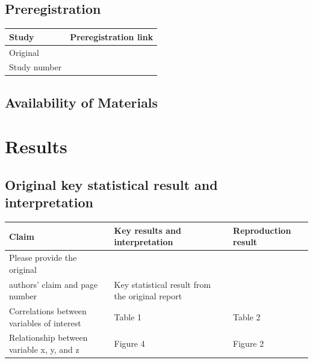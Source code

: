 \documentclass[
  letterpaper,
  DIV=11,
  numbers=noendperiod]{scrartcl}
\begin{document}
\newpage{}

\subsection{Preregistration}\label{preregistration}

\begin{longtable}[]{@{}ll@{}}
\toprule\noalign{}
Study & Preregistration link \\
\midrule\noalign{}
\endhead
\bottomrule\noalign{}
\endlastfoot
Original & \\
Study number & \\
\end{longtable}

\subsection{Availability of Materials}\label{availability-of-materials}

\section{Results}\label{results}

\subsection{Original key statistical result and
interpretation}\label{original-key-statistical-result-and-interpretation}

\begin{longtable}[]{@{}
  >{\raggedright\arraybackslash}p{}
  >{\raggedright\arraybackslash}p{}
  >{\raggedright\arraybackslash}p{}@{}}
\toprule\noalign{}
\begin{minipage}[b]{\linewidth}\raggedright
Claim
\end{minipage} & \begin{minipage}[b]{\linewidth}\raggedright
Key results and interpretation
\end{minipage} & \begin{minipage}[b]{\linewidth}\raggedright
Reproduction result
\end{minipage} \\
\midrule\noalign{}
\endhead
\bottomrule\noalign{}
\endlastfoot
Please provide the original & & \\
authors' claim and page number & Key statistical result from the
original report & \\
Correlations between variables of interest & Table 1 & Table 2 \\
Relationship between variable x, y, and z & Figure 4 & Figure 2 \\
\end{longtable}
\end{document}
